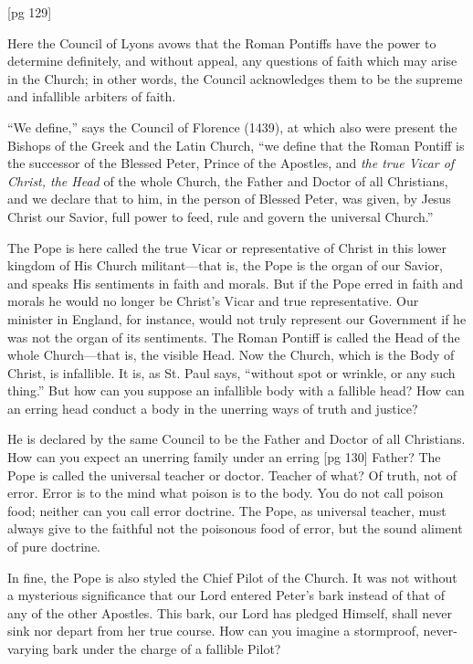 [pg 129]

Here the Council of Lyons avows that the Roman
Pontiffs have the power to determine definitely,
and without appeal, any questions of faith
which may arise in the Church; in other words,
the Council acknowledges them to be the supreme
and infallible arbiters of faith.

“We define,” says the Council of Florence
(1439), at which also were present the Bishops
of the Greek and the Latin Church, “we define
that the Roman Pontiff is the successor of the
Blessed Peter, Prince of the Apostles, and \emph{the
true Vicar of Christ, the Head} of the whole
Church, the Father and Doctor of all Christians,
and we declare that to him, in the person of
Blessed Peter, was given, by Jesus Christ our
Savior, full power to feed, rule and govern the
universal Church.”

The Pope is here called the true Vicar or representative
of Christ in this lower kingdom of His
Church militant—that is, the Pope is the organ of
our Savior, and speaks His sentiments in faith
and morals. But if the Pope erred in faith and
morals he would no longer be Christ's Vicar and
true representative. Our minister in England, for
instance, would not truly represent our Government
if he was not the organ of its sentiments.
The Roman Pontiff is called the Head of the whole
Church—that is, the visible Head. Now the
Church, which is the Body of Christ, is infallible.
It is, as St. Paul says, “without spot or wrinkle,
or any such thing.” But how can you suppose
an infallible body with a fallible head? How can
an erring head conduct a body in the unerring
ways of truth and justice?

He is declared by the same Council to be the
Father and Doctor of all Christians.
How can you expect an unerring family under an erring
[pg 130]
Father? The Pope is called the universal teacher
or doctor. Teacher of what? Of truth, not of
error. Error is to the mind what poison is to the
body. You do not call poison food; neither can
you call error doctrine. The Pope, as universal
teacher, must always give to the faithful not the
poisonous food of error, but the sound aliment of
pure doctrine.

In fine, the Pope is also styled the Chief Pilot
of the Church. It was not without a mysterious
significance that our Lord entered Peter's bark
instead of that of any of the other Apostles. This
bark, our Lord has pledged Himself, shall never
sink nor depart from her true course. How can
you imagine a stormproof, never-varying bark under
the charge of a fallible Pilot?

